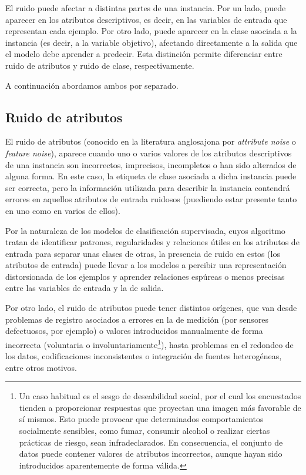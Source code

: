 \documentclass[print, color]{ugrTFG}
\begin{document}
El ruido puede afectar a distintas partes de una instancia. Por un lado, puede aparecer en los atributos descriptivos, es decir, en las variables de entrada que representan cada ejemplo. Por otro lado, puede aparecer en la clase asociada a la instancia (es decir, a la variable objetivo), afectando directamente a la salida que el modelo debe aprender a predecir. Esta distinción permite diferenciar entre ruido de atributos y ruido de clase, respectivamente.

A continuación abordamos ambos por separado.
\subsection{Ruido de atributos}

El ruido de atributos (conocido en la literatura anglosajona por \textit{attribute noise} o \textit{feature noise}), aparece cuando uno o varios valores de los atributos descriptivos de una instancia son incorrectos, imprecisos, incompletos o han sido alterados de alguna forma. En este caso, la etiqueta de clase asociada a dicha instancia puede ser correcta, pero la información utilizada para describir la instancia contendrá errores en aquellos atributos de entrada ruidosos (puediendo estar presente tanto en uno como en varios de ellos).

Por la naturaleza de los modelos de clasificación supervisada, cuyos algoritmo tratan de identificar patrones, regularidades y relaciones útiles en los atributos de entrada para separar unas clases de otras, la presencia de ruido en estos (los atributos de entrada) puede llevar a los modelos a percibir una representación distorsionada de los ejemplos y aprender relaciones espúreas o menos precisas entre las variables de entrada y la de salida.

Por otro lado, el ruido de atributos puede tener distintos orígenes, que van desde problemas de registro asociados a errores en la de medición (por sensores defectuosos, por ejemplo) o valores introducidos manualmente de forma incorrecta (voluntaria o involuntariamente\footnote{Un caso habitual es el sesgo de deseabilidad social, por el cual los encuestados tienden a proporcionar respuestas que proyectan una imagen más favorable de sí mismos\cite{althubaiti_information_2016}. Esto puede provocar que determinados comportamientos socialmente sensibles, como fumar, consumir alcohol o realizar ciertas prácticas de riesgo, sean infradeclarados. En consecuencia, el conjunto de datos puede contener valores de atributos incorrectos, aunque hayan sido introducidos aparentemente de forma válida.}), hasta problemas en el redondeo de los datos, codificaciones inconsistentes o integración de fuentes heterogéneas, entre otros motivos. 
\end{document}
